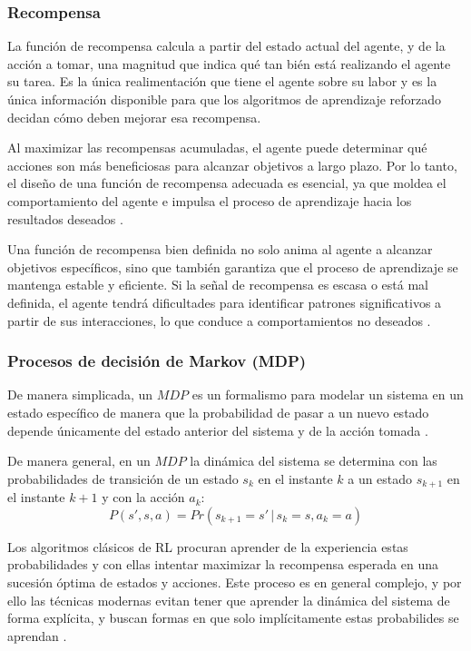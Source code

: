 \subsubsection{Recompensa}

La función de recompensa calcula a partir del estado actual del agente, y de la acción a tomar, una magnitud que indica qué tan bién está realizando el agente su tarea. Es la única realimentación que tiene el agente sobre su labor y es la única información disponible para que los algoritmos de aprendizaje reforzado decidan cómo deben mejorar esa recompensa.

Al maximizar las recompensas acumuladas, el agente puede determinar qué acciones son más beneficiosas para alcanzar objetivos a largo plazo. Por lo tanto, el diseño de una función de recompensa adecuada es esencial, ya que moldea el comportamiento del agente e impulsa el proceso de aprendizaje hacia los resultados deseados \cite{RLIntro}.

Una función de recompensa bien definida no solo anima al agente a alcanzar objetivos específicos, sino que también garantiza que el proceso de aprendizaje se mantenga estable y eficiente. Si la señal de recompensa es escasa o está mal definida, el agente tendrá dificultades para identificar patrones significativos a partir de sus interacciones, lo que conduce a comportamientos no deseados \cite{RLIntro}.


\subsubsection{Procesos de decisión de Markov (MDP)}

De manera simplicada, un $MDP$ es un formalismo para modelar un sistema en un estado específico de manera que la probabilidad de pasar a un nuevo estado depende únicamente del estado anterior del sistema y de la acción tomada \cite{DataScience}. 

De manera general, en un $MDP$ la dinámica del sistema se determina con las probabilidades de transición de un estado $s_k$ en el instante $k$ a un estado $s_{k+1}$ en el instante $k+1$ y con la acción $a_k$:
\begin{equation}
P(s', s, a) = Pr(s_{k+1}=s'\,|\, s_k=s, a_k=a)
\end{equation}

Los algoritmos clásicos de RL procuran aprender de la experiencia estas probabilidades y con ellas intentar maximizar la recompensa esperada en una sucesión óptima de estados y acciones. Este proceso es en general complejo, y por ello las técnicas modernas evitan tener que aprender la dinámica del sistema de forma explícita, y buscan formas en que solo implícitamente estas probabilides se aprendan \cite{DataScience}.

